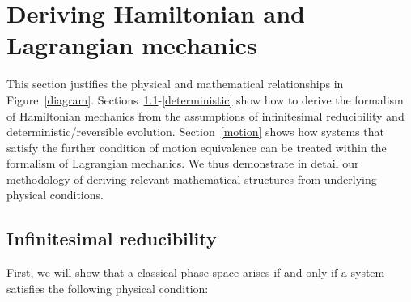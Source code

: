 \documentclass[letterpaper]{article}
\begin{document}



\section{Deriving Hamiltonian and Lagrangian mechanics}
\label{derivation}


This section justifies the physical and mathematical relationships in Figure~\ref{diagram}.
Sections~\ref{infinitesimal}-\ref{deterministic} show how to derive the formalism of Hamiltonian mechanics from the assumptions of infinitesimal reducibility and deterministic/reversible evolution. Section~\ref{motion} shows how systems that satisfy the further condition of motion equivalence can be treated within the formalism of Lagrangian mechanics. We thus demonstrate in detail our methodology of deriving  relevant mathematical structures from underlying physical conditions.


\subsection{Infinitesimal reducibility}
\label{infinitesimal}

First, we will show that a classical phase space arises if and only if a system satisfies the following physical condition:
\end{document}
